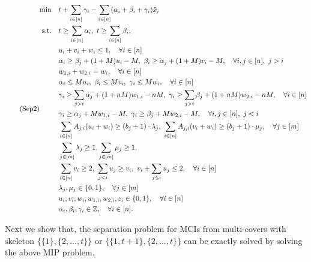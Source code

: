 \begin{align}
\label{Sep2}
\tag{Sep2}
\begin{split}
\min \quad & t + \sum_{i \in [n]} \gamma_i - \sum_{i \in [n]} (\alpha_i + \beta_i + \gamma_i) \tilde x_i \\
\text{s.t.} \quad & t \geq \sum_{i \in [n]} \alpha_i, \ t \geq  \sum_{i \in [n]} \beta_i, \\
& u_i + v_i + w_i \leq 1, \quad \forall i \in [n] \\
&  \alpha_i \geq \beta_j + (1+M)u_i - M, \ \beta_i \geq \alpha_j + (1+M) v_i - M, \quad  \forall i,j \in [n], \ j > i\\
& w_{1,i} + w_{2,i} = w_i, \quad \forall i \in [n] \\
&  \alpha_i \leq M u_i, \ \beta_i \leq M v_i, \ \gamma_i \leq M w_i, \quad \forall i \in [n] \\
& \gamma_i \geq \sum_{j>i} \alpha_j + (1+nM)w_{1,i} -nM, \ \gamma_i \geq \sum_{j>i} \beta_j + (1+nM) w_{2,i} -nM, \quad \forall i \in [n]\\
& \gamma_i \geq  \alpha_j + Mw_{1,i}-M, \ \gamma_i \geq  \beta_j + M w_{2,i} - M, \quad \forall i,j \in [n], \ j < i \\
& \sum_{i \in [n]} A_{j,i} (u_i + w_i) \geq (b_j+1) \cdot \lambda_j, \ \sum_{i \in [n]} A_{j,i} (v_i + w_i) \geq (b_j+1) \cdot \mu_j, \quad \forall j \in [m] \\
& \sum_{j \in[m]} \lambda_j \geq 1, \sum_{j \in[m]} \mu_j \geq 1,\\
& \sum_{i \in [n]} v_i \geq 2, \ \sum_{j<i} u_j \geq v_i, \ v_i + \sum_{j \leq i} u_j \leq 2, \quad \forall i \in [n] \\
& \lambda_j, \mu_j \in \{0,1\}, \quad \forall j \in [m] \\
& u_i, v_i, w_i, w_{1,i}, w_{2,i}, z_i \in \{0,1\}, \quad \forall i \in [n] \\
& \alpha_i, \beta_i, \gamma_i \in \mathbb{Z}, \quad \forall i \in [n].
\end{split}
\end{align}

Next we show that, the separation problem for MCIs from multi-covers with skeleton $\{\{1\}, \{2, \ldots, t\}\}$ or $\{\{1,t+1\}, \{2, \ldots, t\}\}$ can be exactly solved by solving the above MIP problem.


